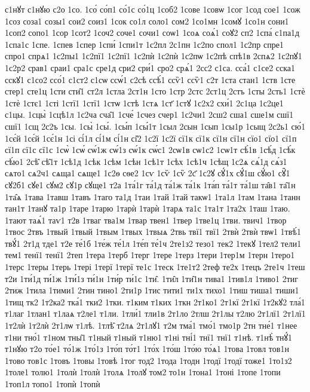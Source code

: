 {с1нꙋт
с1нꙋю
с2о
1со.
1со́
со́п1
со́1с
со́1ц
1соб2
1сове
1совѡ
1сог
1сод
сое1
1сож
1соз
соза1
созы1
сои2
соиз1
1сок
со1л
соло1
сом2
1со1мн
1сомꙋ
1со1н
сони1
1соп2
сопо1
1сор
1сот2
1соч2
соче1
сочи1
соѡ1
1соѧ
соѧ́1
соꙋ2
сп2
1спа́
с1па1д
1спа1с
1спе.
1спев
1спер
1спи́
1спи1т
1с2пл
2с1пн
1с2по
спол1
1с2пр
спре1
спро1
спрѧ1
1с2пы1
1с2пї1
1с2пї1
1с2пѝ
1с2пѝ
1с2пѡ
1с2пѣ
спѣ1в
2спѧ2
1с2пꙋ1
1с2р2
срав1
сраи1
сра1с
сре1д
сри2
сри́1
сро2
срѧ́1
2сс2
с1са.
сса́1
с1се2
сска1
сскꙋ1
с1со2
ссо́1
с1ст2
с1сѡ
ссѡ́1
с2сѣ
ссѣ́1
ссѷ1
ссѷ1
с2т
1ста
стан1
1ств
1сте
стер1
сте1ц
1сти
сти̑1
ст2л
1стла
2ст1н
1сто
1стр
2стс
2ст1ц
2стъ
1сты
2сть1
1стѐ
1стѐ
1стє1
1сті
1стї1
1стї1
1стѡ
1стѣ
1стѧ
1ст҃
1стꙋ
1с2х2
схи́1
2с1ца
1с2це1
с1цы.
1сцы̀
1сцѣ1л
1с2ча
сча̑1
1сче́
1счез
счер1
1с2чи1
2сш2
сша1
сше1м
сшї1
сшї1
1сщ
2с2ъ
1сы.
1сы̀
1сы́.
1сы́п
1сы́1т
1сыл
2сын
1сып
1сы1р
1сыщ
2с2ь1
сю́1
1сє́й
1сє́й
1сє́1н
1сі
сі́1л
сі́1м
сі́1н
сі̑2
1с2ї
1с2ї
сї1к
сї1к
сї1н
сї1н
сїо1
сїо1
сї1п
сї1п
сї1с
сї1с
1сѡ̀
1сѡ́
сѡ́1ж
сѡ́1з
сѡ́1к
сѡ́с1
2сѡ1в
сѡ1с2
1сѡ1т
сѣ́1в
1сѣ́д
1сѣ́к
сѣ́ю1
2сѣ̑
сѣ̑1т
1сѣ1д
1сѣк
1сѣм
1сѣн
1сѣ1т
1сѣх
1сѣ1ч
1сѣщ
1с2ѧ
сѧ́1д
сѧ́з1
сѧто1
сѧ2ч1
сѧща1
сѧще1
1с2ѳ
сѳе2
1сѵ
1сѷ
1сѷ
2с҃
1с2ꙋ
сꙋ́1х
сꙋ́1ш
сꙋ́ю1
сꙋ̑1
сꙋ2б1
сꙋе1
сꙋм2
сꙋ1р
сꙋще1
т2а
1та́1г
та́1д
та́1ж
та́1к
1та́п
та́1т
та́1ш
та̑в1
та̑1н
1та̑ѧ
1тава
1тавш
1тавъ
1таго
та1д
1таи
1тай
1тай
такѡ1
1та1л
1там
1тана
1танн
тан1т
1танꙋ
та1р
1таре
1тарю
1тарѝ
1тарѝ
1тарѧ
та1с
1та1т
1та2х
1таш
1таю.
1тают
таѧ́1
таѵ1
т2в
1тваг
тва1м
1твар
твен1
1твер
1тве1ц
1тви.
твич1
1твор
1твос
2твъ
1твый
1твый
1твым
1твых
1твыѧ
2твь
твї1
твї1
2твѝ
2твѝ
твѡ1
1твѣ́1
твꙋ́1
2т1д
тде1
т2е
те́1б
1те́ж
те́1л
1те́п
те́1ч
2те1з2
тезо1
тек2
1текꙋ
1тел2
тели1
тем1
тенї1
тенї1
2теп
1тера
1терб
1терг
1тере
1терз
1тери
1тер1м
1терн
1теро1
1терс
1теры
1терь
1тері
1терї
1терї
те1с
1теск
1те1т2
2теф
те2х
1тецъ
2те1ч
1теш
т2и
1ти́1д
ти́1ж
1ти́1з
ти́1н
1ти́р
ти́1с
1ти̑.
1ти̑л
1ти̑1н
тива1
1тив1л
1тиво1
2тиг
2тиж
1тила
1тими1
2тин
тино1
2ти1р
1тис
тити1
ти1х
тихо1
1тиш
тиша1
тиши1
1тищ
тк2
1т2ка2
тка́1
тки2
1тки.
т1ким
т1ких
1ткн
2т1ко1
2т1кї
2т1кї
1т2кꙋ2
тла́1
т1лаг
1тлан1
т1лаѧ
т2ле1
т1ли.
1тли́1
тли1в
2т1ло
2тлш
2т1лы
т2лю
2т1лї1
2т1лї1
1т2лѝ
1т2лѝ
2т1лѡ
т1лѣ.
1тлѣ̑
т2лѧ
2т1лꙋ1
т2м
тма́1
тмо́1
тмо1р
2тн
тне́1
т1нее
т1ни
тно́1
т1ном
тны̑1
т1ный
т1ный
т1ню1
т1ні
тні́1
тнї1
тнї1
т1нѣ.
т1нѣ̀
тнꙋ́1
т1нꙋю
т2о
то́е1
то́1ж
1то́1з
1то́п
то́т1
1то́х
1то́ш
1то́ю
то́ѧ1
1това
1товл
тов1н
1тово
тов1с
1товъ
1товы
1товѣ
1тог
тод2
1тода
1тодн
1тодї
1тодї
тоже1
1то1з2
1толе1
толю1
1толѝ
1толѝ
1толѧ
1толꙋ
том2
то1н
1тона1
1тоні
1топе
1топи
1топ1л
топо1
1топѝ
1топѝ
}
